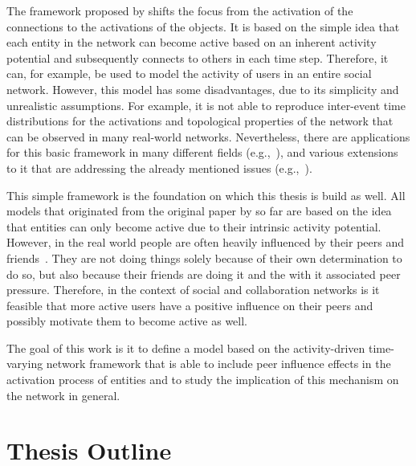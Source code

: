 The framework proposed by \citet{Perra2012a} shifts the focus from the activation of the connections to the activations of the objects.
It is based on the simple idea that each entity in the network can become active based on an inherent activity potential and subsequently connects to others in each time step.
Therefore, it can, for example, be used to model the activity of users in an entire social network.
However, this model has some disadvantages, due to its simplicity and unrealistic assumptions.
For example, it is not able to reproduce inter-event time distributions for the activations and topological properties of the network that can be observed in many real-world networks.
Nevertheless, there are applications for this basic framework in many different fields (e.g.,~\cite{Rizzo2014, Rizzo2016}), and various extensions to it that are addressing the already mentioned issues (e.g.,~\cite{Laurent2015, Moinet2015, Moinet2016}).

This simple framework is the foundation on which this thesis is build as well.
All models that originated from the original paper by \citet{Perra2012a} so far are based on the idea that entities can only become active due to their intrinsic activity potential.
However, in the real world people are often heavily influenced by their peers and friends~\cite{Walk2016}.
They are not doing things solely because of their own determination to do so, but also because their friends are doing it and the with it associated peer pressure.
Therefore, in the context of social and collaboration networks is it feasible that more active users have a positive influence on their peers and possibly motivate them to become active as well.

The goal of this work is it to define a model based on the activity-driven time-varying network framework that is able to include peer influence effects in the activation process of entities and to study the implication of this mechanism on the network in general.




\section{Thesis Outline}
\label{sec:outline}

